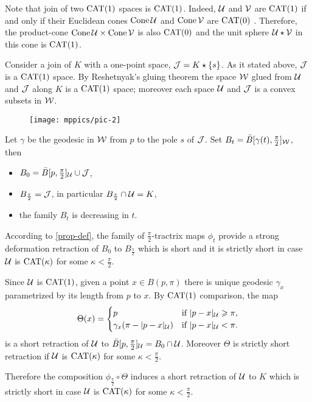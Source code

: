 \documentclass[oneside,a4paper, 12pt]{article}
\begin{document}
Note that join of two $\mathrm{CAT}(1)$ spaces is $\mathrm{CAT}(1)$.
Indeed, $\mathcal{U}$ and $\mathcal{V}$ are $\mathrm{CAT}(1)$ if and only if their Euclidean cones $\mathop{\rm Cone}\nolimits \mathcal{U}$ and $\mathop{\rm Cone}\nolimits\mathcal{V}$ are $\mathrm{CAT}(0)$ \cite[10.4.2]{akp}.
Therefore, the product-cone $\mathop{\rm Cone}\nolimits \mathcal{U}\times\mathop{\rm Cone}\nolimits\mathcal{V}$ is also $\mathrm{CAT}(0)$ and the unit sphere $\mathcal{U}\star\mathcal{V}$ in this cone is $\mathrm{CAT}(1)$.

Consider a join of  $K$ with a one-point space, $\mathcal{J}=K\star \{s\}$.
As it stated above, $\mathcal{J}$ is a $\mathrm{CAT}(1)$ space.
By Reshetnyak's gluing theorem \cite[8.9.1]{akp} the space $\mathcal{W}$ glued from ${\mathcal{U}}$ and $\mathcal{J}$ along $K$ is a $\mathrm{CAT}(1)$ space;
moreover each space ${\mathcal{U}}$ and $\mathcal{J}$ is a convex subsets in $\mathcal{W}$.

\begin{wrapfigure}{o}{50 mm}
\vskip-0mm
\centering
\texttt{[image: mppics/pic-2]}
\end{wrapfigure} 

Let $\gamma$ be the geodesic in $\mathcal{W}$ from $p$ to the pole $s$ of $\mathcal{J}$.
Set $B_t=\bar B[\gamma(t),\tfrac\pi2]_{\mathcal{W}}$, then
\begin{itemize}
\item $B_0=\bar B[p,\tfrac\pi2]_{\mathcal{U}}\cup \mathcal{J}$,
\item $B_{\frac\pi2}=\mathcal{J}$, in particular $B_{\frac\pi2}\cap \mathcal{U}=K$,
\item the family $B_t$ is decreasing in $t$.
\end{itemize}
According to \ref{prop-def}, the family of $\tfrac\pi2$-tractrix maps $\phi_t$ provide a strong deformation retraction of $B_0$ to $B_{\frac\pi2}$ which is short and it is strictly short in case $\mathcal{U}$ is $\mathrm{CAT}(\kappa)$ for some $\kappa<\tfrac\pi2$.

Since ${\mathcal{U}}$ is $\mathrm{CAT}(1)$,
given a point $x\in B(p,\pi)$ there is unique geodesic $\gamma_x$ parametrized by its length from $p$ to $x$. 
By $\mathrm{CAT}(1)$ comparison, the map 
\[\Theta(x)=
\begin{cases}
p&\text{if\ }|p-x|_{\mathcal{U}}\geqslant \pi,
\\
\gamma_x(\pi-|p-x|_{\mathcal{U}})&\text{if\ }|p-x|_{\mathcal{U}}< \pi.
\end{cases}
\]
is a short retraction of ${\mathcal{U}}$ to $\bar B[p,\tfrac\pi2]_{\mathcal{U}}=B_0\cap \mathcal{U}$.
Moreover $\Theta$ is strictly short retraction if $\mathcal{U}$ is $\mathrm{CAT}(\kappa)$ for some $\kappa<\tfrac\pi2$.

Therefore the composition $\phi_{\frac\pi2}\circ\Theta$ induces a short retraction of ${\mathcal{U}}$ to $K$
which is strictly short in case $\mathcal{U}$ is $\mathrm{CAT}(\kappa)$ for some $\kappa<\tfrac\pi2$.
\end{document}
